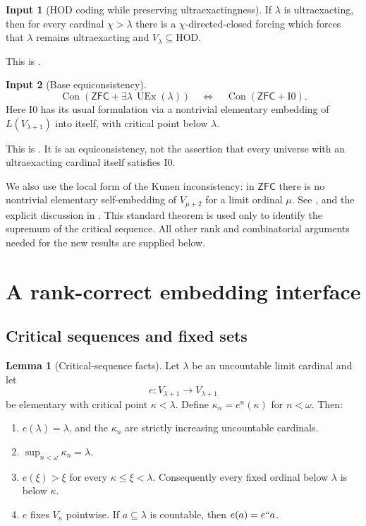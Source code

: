 \documentclass[11pt,letterpaper]{article}
\theoremstyle{definition}
\newtheorem{lemma}[definition]{Lemma}
\newtheorem{inputthm}{Input}
\numberwithin{equation}{section}
\newcommand{\ZFC}{\mathsf{ZFC}}
\newcommand{\HOD}{\mathrm{HOD}}
\newcommand{\UEx}{\operatorname{UEx}}
\newcommand{\Con}{\operatorname{Con}}
\newcommand{\Izero}{\mathrm{I0}}
\begin{document}
\begin{inputthm}[HOD coding while preserving ultraexactingness]\label{in:coding}
If $\lambda$ is ultraexacting, then for every cardinal $\chi>\lambda$ there is a $\chi$-directed-closed forcing which forces that $\lambda$ remains ultraexacting and $V_\lambda\subseteq\HOD$.
\end{inputthm}
This is \cite[Proposition 3.9]{abgl}.

\begin{inputthm}[Base equiconsistency]\label{in:equiconsistency}
\[
 \Con(\ZFC+\exists\lambda\,\UEx(\lambda))
       \quad\Longleftrightarrow\quad
 \Con(\ZFC+\Izero).
\]
Here $\Izero$ has its usual formulation via a nontrivial elementary embedding of $L(V_{\lambda+1})$ into itself, with critical point below $\lambda$.
\end{inputthm}
This is \cite[Theorem 4.5]{abgl}. It is an equiconsistency, not the assertion that every universe with an ultraexacting cardinal itself satisfies $\Izero$.

We also use the local form of the Kunen inconsistency: in $\ZFC$ there is no nontrivial elementary self-embedding of $V_{\mu+2}$ for a limit ordinal $\mu$. See \cite{kunen}, and the explicit discussion in \cite[p.~3, footnote 1]{hkp}. This standard theorem is used only to identify the supremum of the critical sequence. All other rank and combinatorial arguments needed for the new results are supplied below.

\section{A rank-correct embedding interface}\label{sec:interface}

\subsection{Critical sequences and fixed sets}

\begin{lemma}[Critical-sequence facts]\label{lem:critical}
Let $\lambda$ be an uncountable limit cardinal and let
\[
 e:V_{\lambda+1}\longrightarrow V_{\lambda+1}
\]
be elementary with critical point $\kappa<\lambda$. Define $\kappa_n=e^n(\kappa)$ for $n<\omega$. Then:
\begin{enumerate}
\item $e(\lambda)=\lambda$, and the $\kappa_n$ are strictly increasing uncountable cardinals.
\item $\sup_{n<\omega}\kappa_n=\lambda$.
\item $e(\xi)>\xi$ for every $\kappa\le\xi<\lambda$. Consequently every fixed ordinal below $\lambda$ is below $\kappa$.
\item $e$ fixes $V_\kappa$ pointwise. If $a\subseteq\lambda$ is countable, then $e(a)=e``a$.
\end{enumerate}
\end{lemma}
\end{document}
